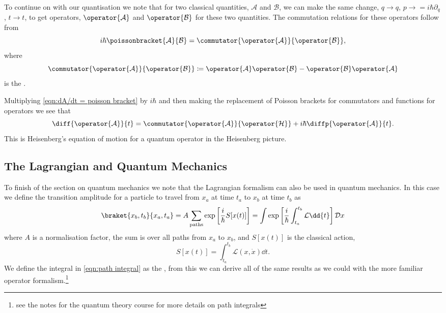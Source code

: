 \documentclass[fleqn]{NotesClass}
\newcommand*{\lagrangian}{\mathcal{L}}
\newcommand*{\hamiltonian}{\mathcal{H}}
\newcommand*{\DL}[1]{\mathcal{D}#1}
\begin{document}
    To continue on with our quantisation we note that for two classical quantities, \(\mathcal{A}\) and \(\mathcal{B}\), we can make the same change, \(q \to q\), \(p \to =i\hbar\partial_q\), \(t \to t\), to get operators, \(\operator{\mathcal{A}}\) and \(\operator{\mathcal{B}}\) for these two quantities.
    The commutation relations for these operators follow from
    \begin{equation}
        i\hbar\poissonbracket{\mathcal{A}}{\mathcal{B}} = \commutator{\operator{\mathcal{A}}}{\operator{\mathcal{B}}},
    \end{equation}
    where
    \begin{equation}
        \commutator{\operator{\mathcal{A}}}{\operator{\mathcal{B}}} \coloneqq \operator{\mathcal{A}}\operator{\mathcal{B}} - \operator{\mathcal{B}}\operator{\mathcal{A}}
    \end{equation}
    is the .
    
    Multiplying \cref{eqn:dA/dt = poisson bracket} by \(i\hbar\) and then making the replacement of Poisson brackets for commutators and functions for operators we see that
    \begin{equation}
        \diff{\operator{\mathcal{A}}}{t} = \commutator{\operator{\mathcal{A}}}{\operator{\hamiltonian}} + i\hbar \diffp{\operator{\mathcal{A}}}{t}.
    \end{equation}
    This is Heisenberg's equation of motion for a quantum operator in the Heisenberg picture.
    
    \subsection{The Lagrangian and Quantum Mechanics}
    To finish of the section on quantum mechanics we note that the Lagrangian formalism can also be used in quantum mechanics.
    In this case we define the transition amplitude for a particle to travel from \(x_a\) at time \(t_a\) to \(x_b\) at time \(t_b\) as
    \begin{equation}\label{eqn:path integral}
        \braket{x_b, t_b}{x_a, t_a} = A \sum_{\text{paths}} \exp\left[ \frac{i}{\hbar} S[x(t)] \right] = \int \exp\left[ \frac{i}{\hbar} \int_{t_a}^{t_b} \lagrangian \dd{t} \right] \DL{x}
    \end{equation}
    where \(A\) is a normalisation factor, the sum is over all paths from \(x_a\) to \(x_b\), and \(S[x(t)]\) is the classical action,
    \begin{equation}
        S[x(t)] = \int_{t_a}^{t_b} \lagrangian(x, \dot{x}) \dd{t}.
    \end{equation}
    We define the integral in \cref{eqn:path integral} as the , from this we can derive all of the same results as we could with the more familiar operator formalism.\footnote{see the notes for the quantum theory course for more details on path integrals}
    
\end{document}

